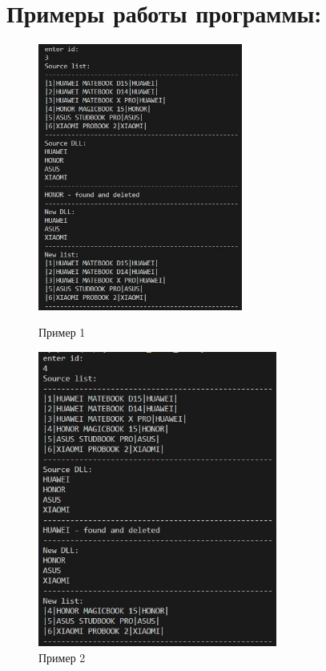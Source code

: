 \documentclass[a4paper,12pt]{report}
\begin{document}
\section*{Примеры работы программы:}
\begin{figure}[ph]
    \includegraphics[width=0.6\textwidth]{ex1.jpg}
\caption{Пример 1}
\label{ris:image1}
    \includegraphics[width=0.7\textwidth]{ex2.jpg}
\caption{Пример 2}
\label{ris:image2}


\end{figure}
\end{document}
